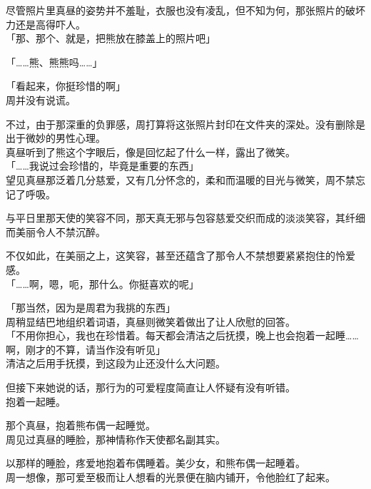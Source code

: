 尽管照片里真昼的姿势并不羞耻，衣服也没有凌乱，但不知为何，那张照片的破坏力还是高得吓人。\\

「那、那个、就是，把熊放在膝盖上的照片吧」

「……熊、熊熊吗……」

「看起来，你挺珍惜的啊」\\

周并没有说谎。

不过，由于那深重的负罪感，周打算将这张照片封印在文件夹的深处。没有删除是出于微妙的男性心理。\\

真昼听到了熊这个字眼后，像是回忆起了什么一样，露出了微笑。\\

「……我说过会珍惜的，毕竟是重要的东西」\\

望见真昼那泛着几分慈爱，又有几分怀念的，柔和而温暖的目光与微笑，周不禁忘记了呼吸。

与平日里那天使的笑容不同，那天真无邪与包容慈爱交织而成的淡淡笑容，其纤细而美丽令人不禁沉醉。

不仅如此，在美丽之上，这笑容，甚至还蕴含了那令人不禁想要紧紧抱住的怜爱感。\\

「……啊，嗯，呃，那什么。你挺喜欢的呢」

「那当然，因为是周君为我挑的东西」\\

周稍显结巴地组织着词语，真昼则微笑着做出了让人欣慰的回答。\\

「不用你担心，我也在珍惜着。每天都会清洁之后抚摸，晚上也会抱着一起睡……啊，刚才的不算，请当作没有听见」\\

清洁之后用手抚摸，到这段为止还没什么大问题。

但接下来她说的话，那行为的可爱程度简直让人怀疑有没有听错。\\

抱着一起睡。

那个真昼，抱着熊布偶一起睡觉。\\

周见过真昼的睡脸，那神情称作天使都名副其实。

以那样的睡脸，疼爱地抱着布偶睡着。美少女，和熊布偶一起睡着。\\

周一想像，那可爱至极而让人想看的光景便在脑内铺开，令他脸红了起来。\\

